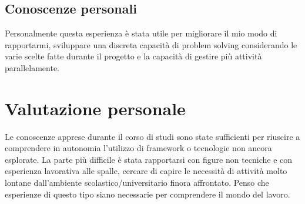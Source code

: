 

\subsection{Conoscenze personali}

Personalmente questa esperienza è stata utile per migliorare il mio modo di
rapportarmi, sviluppare una discreta capacità di problem solving considerando le varie
scelte fatte durante il progetto e la capacità di gestire più attività parallelamente.



\section{Valutazione personale}

Le conoscenze apprese durante il corso di studi sono state sufficienti per riuscire a
comprendere in autonomia l'utilizzo di framework o tecnologie non ancora esplorate. La parte
più difficile è stata rapportarsi con figure non tecniche e con esperienza lavorativa alle spalle, cercare di capire le necessità di attività molto lontane dall'ambiente scolastico/universitario finora affrontato. Penso che esperienze di questo tipo siano necessarie per comprendere il mondo del lavoro.
























